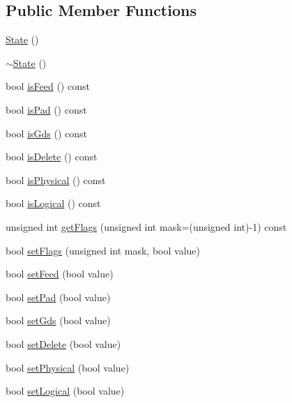 \subsection*{Public Member Functions}
\begin{DoxyCompactItemize}
\item 
\hyperlink{classCRL_1_1Catalog_1_1State_a97e69ca85c09942e20d41013b8ff5280}{State} ()
\item 
\hyperlink{classCRL_1_1Catalog_1_1State_ae25003eae8262a994fba979f28c35aed}{$\sim$\-State} ()
\item 
bool \hyperlink{classCRL_1_1Catalog_1_1State_aab39e2bb6a238a4ae3a82ab8ac4f0593}{is\-Feed} () const 
\item 
bool \hyperlink{classCRL_1_1Catalog_1_1State_ae0f83319e1de5609e1f429c048dab8bb}{is\-Pad} () const 
\item 
bool \hyperlink{classCRL_1_1Catalog_1_1State_ab8f45372b46f9db7855ee98eefdbd5ad}{is\-Gds} () const 
\item 
bool \hyperlink{classCRL_1_1Catalog_1_1State_a860d0ec35b5350f7e70ed30dc999b6dc}{is\-Delete} () const 
\item 
bool \hyperlink{classCRL_1_1Catalog_1_1State_a39c92430456ac8be2ec80310e78170aa}{is\-Physical} () const 
\item 
bool \hyperlink{classCRL_1_1Catalog_1_1State_a084e955d5b7132b0f739951ca82fbb4a}{is\-Logical} () const 
\item 
unsigned int \hyperlink{classCRL_1_1Catalog_1_1State_ac6ec60080ed8b5121be6eb74d12361bd}{get\-Flags} (unsigned int mask=(unsigned int)-\/1) const 
\item 
bool \hyperlink{classCRL_1_1Catalog_1_1State_a73a3866e9da359611638b2d725a79613}{set\-Flags} (unsigned int mask, bool value)
\item 
bool \hyperlink{classCRL_1_1Catalog_1_1State_ab5936e80369947177be88c3d770f4725}{set\-Feed} (bool value)
\item 
bool \hyperlink{classCRL_1_1Catalog_1_1State_a97e2158809ed0e88237bb92eb8daa290}{set\-Pad} (bool value)
\item 
bool \hyperlink{classCRL_1_1Catalog_1_1State_acc0c819f382393dc780bb19c7788b216}{set\-Gds} (bool value)
\item 
bool \hyperlink{classCRL_1_1Catalog_1_1State_a53873a1a42083389dfae02b46b3f2de3}{set\-Delete} (bool value)
\item 
bool \hyperlink{classCRL_1_1Catalog_1_1State_a85a091727c8e7de2b16d01088324de0d}{set\-Physical} (bool value)
\item 
bool \hyperlink{classCRL_1_1Catalog_1_1State_af41327abeb4e7646ef5cafabe8eeabd0}{set\-Logical} (bool value)

\end{DoxyCompactItemize}
